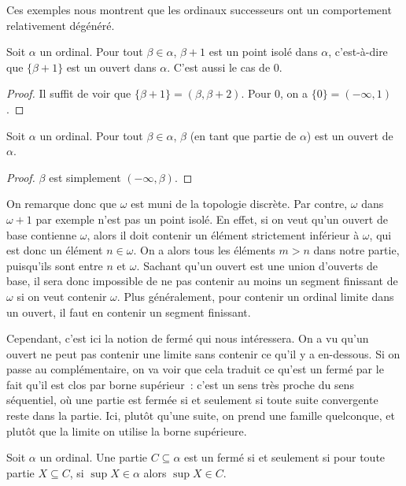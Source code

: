 Ces exemples nous montrent que les ordinaux successeurs ont un comportement
relativement dégénéré.

\begin{proposition}
  Soit $\alpha$ un ordinal. Pour tout $\beta \in \alpha$, $\beta + 1$ est un
  point isolé dans $\alpha$, c'est-à-dire que $\{\beta + 1\}$ est un ouvert
  dans $\alpha$. C'est aussi le cas de $0$.
\end{proposition}

\begin{proof}
  Il suffit de voir que $\{\beta + 1\} = (\beta, \beta + 2)$. Pour $0$, on a
  $\{0\} = (-\infty, 1)$.
\end{proof}

\begin{proposition}
  Soit $\alpha$ un ordinal. Pour tout $\beta \in \alpha$, $\beta$ (en tant que
  partie de $\alpha$) est un ouvert de $\alpha$.
\end{proposition}

\begin{proof}
  $\beta$ est simplement $(-\infty, \beta)$.
\end{proof}

On remarque donc que $\omega$ est muni de la topologie discrète. Par contre,
$\omega$ dans $\omega + 1$ par exemple n'est pas un point isolé. En effet,
si on veut qu'un ouvert de base contienne $\omega$, alors il doit contenir un
élément strictement inférieur à $\omega$, qui est donc un élément
$n \in \omega$. On a alors tous les éléments $m > n$ dans notre partie,
puisqu'ils sont entre $n$ et $\omega$. Sachant qu'un ouvert est une union
d'ouverts de base, il sera donc impossible de ne pas contenir au moins un
segment finissant de $\omega$ si on veut contenir $\omega$. Plus généralement,
pour contenir un ordinal limite dans un ouvert, il faut en contenir un segment
finissant.

Cependant, c'est ici la notion de fermé qui nous intéressera. On a vu qu'un
ouvert ne peut pas contenir une limite sans contenir ce qu'il y a en-dessous.
Si on passe au complémentaire, on va voir que cela traduit ce qu'est un fermé
par le fait qu'il est clos par borne supérieur~: c'est un sens très proche du
sens séquentiel, où une partie est fermée si et seulement si toute suite
convergente reste dans la partie. Ici, plutôt qu'une suite, on prend une famille
quelconque, et plutôt que la limite on utilise la borne supérieure.

\begin{proposition}
  Soit $\alpha$ un ordinal. Une partie $C\subseteq \alpha$ est un fermé si et
  seulement si pour toute partie $X\subseteq C$, si $\sup X \in \alpha$ alors
  $\sup X \in C$.
\end{proposition}

